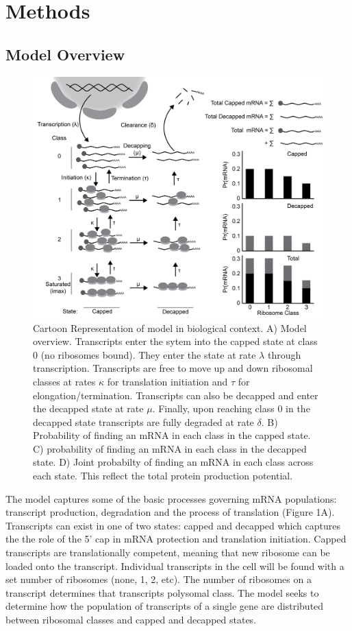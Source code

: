 \documentclass[review]{elsarticle}
\begin{document}
\section{Methods}\label{sec:description}
\subsection{Model Overview}
\begin{figure}[!ht]
\centering
\includegraphics[width=150mm]{Images/Figure1_biomodel_V3.png}
\caption{Cartoon Representation of model in biological context. A) Model overview. Transcripts enter the sytem into the capped state at class 0 (no ribosomes bound). They enter the state at rate $\lambda$ through transcription. Transcripts are free to move up and down ribosomal classes at rates $\kappa$ for translation initiation and $\tau$ for elongation/termination. Transcripts can also be decapped and enter the decapped state at rate $\mu$. Finally, upon reaching class 0 in the decapped state transcripts are fully degraded at rate $\delta$. B) Probability of finding an mRNA in each class in the capped state. C) probability of finding an mRNA in each class in the decapped state. D) Joint probabilty of finding an mRNA in each class across each state. This reflect the total protein production potential.}
\end{figure}
\clearpage


The model captures some of the basic processes governing mRNA populations: transcript production, degradation and the process of translation (Figure 1A).
Transcripts can exist in one of two states: capped and decapped which captures the the role of the 5' cap in mRNA protection and translation initiation. 
Capped transcripts are translationally competent, meaning that new ribosome can be loaded onto the transcript. 
Individual transcripts in the cell will be found with a set number of ribosomes (none, 1, 2, etc).
The number of ribosomes on a transcript determines that transcripts polysomal class.
The model seeks to determine how the population of transcripts of a single gene are distributed between ribosomal classes and capped and decapped states.
\end{document}
